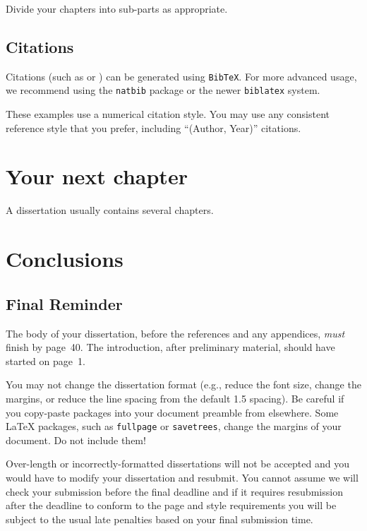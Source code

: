 \documentclass[logo,msc]{infthesis}           %
\begin{document}
Divide your chapters into sub-parts as appropriate.

\section{Citations}

Citations (such as \cite{P1} or \cite{P2}) can be generated using
\texttt{BibTeX}. For more advanced usage, we recommend using the \texttt{natbib}
package or the newer \texttt{biblatex} system.

These examples use a numerical citation style. You may use any consistent
reference style that you prefer, including ``(Author, Year)'' citations.

\chapter{Your next chapter}

A dissertation usually contains several chapters.

\chapter{Conclusions}

\section{Final Reminder}

The body of your dissertation, before the references and any appendices,
\emph{must} finish by page~40. The introduction, after preliminary material,
should have started on page~1.

You may not change the dissertation format (e.g., reduce the font size, change
the margins, or reduce the line spacing from the default 1.5 spacing). Be
careful if you copy-paste packages into your document preamble from elsewhere.
Some \LaTeX{} packages, such as \texttt{fullpage} or \texttt{savetrees}, change
the margins of your document. Do not include them!

Over-length or incorrectly-formatted dissertations will not be accepted and you
would have to modify your dissertation and resubmit. You cannot assume we will
check your submission before the final deadline and if it requires resubmission
after the deadline to conform to the page and style requirements you will be
subject to the usual late penalties based on your final submission time.



\end{document}
